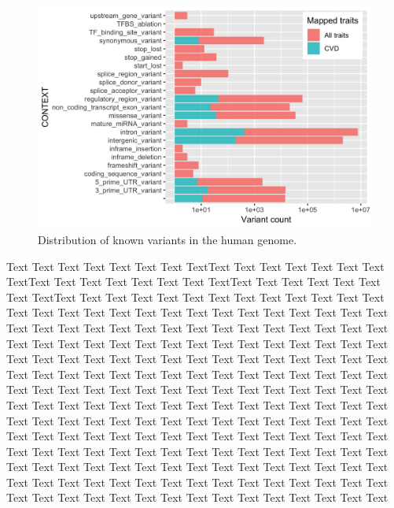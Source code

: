 \documentclass[letter]{bioinfo}
\begin{document}
\begin{figure}[!tpb]
	\includegraphics[width=1\linewidth]{variant_contexts_sigVars}
	\caption{Distribution of known variants in the human genome.}
	\label{fig:variant_context}
\end{figure}

%
Text Text Text Text Text Text  Text TextText Text Text Text Text Text  Text TextText Text Text Text Text Text  Text TextText Text Text Text Text Text  Text TextText Text Text Text Text Text  Text Text Text Text Text Text Text Text  Text Text Text Text Text Text Text Text  Text Text Text Text Text Text Text Text  Text Text Text Text Text Text Text Text  Text Text Text Text Text Text Text Text  Text Text Text Text Text Text Text Text  Text Text Text Text Text Text Text Text  Text Text Text Text Text Text Text Text  Text Text Text Text Text Text Text Text  Text Text Text Text Text Text Text Text  Text Text Text Text Text Text Text Text  Text Text Text Text Text Text Text Text  Text Text Text Text Text Text Text Text  Text Text Text Text Text Text Text Text  Text Text Text Text Text Text Text Text  Text Text Text Text Text Text Text Text  Text Text Text Text Text Text Text Text  Text Text Text Text Text Text Text Text  Text Text Text Text Text Text Text Text  Text Text Text Text Text Text Text Text  Text Text Text Text Text Text Text Text  Text Text Text Text Text Text Text Text  Text Text Text Text Text Text Text Text  Text Text Text Text Text Text Text Text  Text Text Text Text Text Text Text Text  Text Text 
\end{document}
